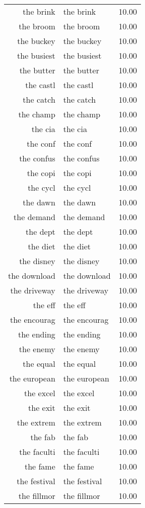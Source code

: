 \begin{table}[ht]
\begin{tabular}{rlr}
  the brink & the brink & 10.00 \\ 
  the broom & the broom & 10.00 \\ 
  the buckey & the buckey & 10.00 \\ 
  the busiest & the busiest & 10.00 \\ 
  the butter & the butter & 10.00 \\ 
  the castl & the castl & 10.00 \\ 
  the catch & the catch & 10.00 \\ 
  the champ & the champ & 10.00 \\ 
  the cia & the cia & 10.00 \\ 
  the conf & the conf & 10.00 \\ 
  the confus & the confus & 10.00 \\ 
  the copi & the copi & 10.00 \\ 
  the cycl & the cycl & 10.00 \\ 
  the dawn & the dawn & 10.00 \\ 
  the demand & the demand & 10.00 \\ 
  the dept & the dept & 10.00 \\ 
  the diet & the diet & 10.00 \\ 
  the disney & the disney & 10.00 \\ 
  the download & the download & 10.00 \\ 
  the driveway & the driveway & 10.00 \\ 
  the eff & the eff & 10.00 \\ 
  the encourag & the encourag & 10.00 \\ 
  the ending & the ending & 10.00 \\ 
  the enemy & the enemy & 10.00 \\ 
  the equal & the equal & 10.00 \\ 
  the european & the european & 10.00 \\ 
  the excel & the excel & 10.00 \\ 
  the exit & the exit & 10.00 \\ 
  the extrem & the extrem & 10.00 \\ 
  the fab & the fab & 10.00 \\ 
  the faculti & the faculti & 10.00 \\ 
  the fame & the fame & 10.00 \\ 
  the festival & the festival & 10.00 \\ 
  the fillmor & the fillmor & 10.00 \\ 

\end{tabular}
\end{table}
